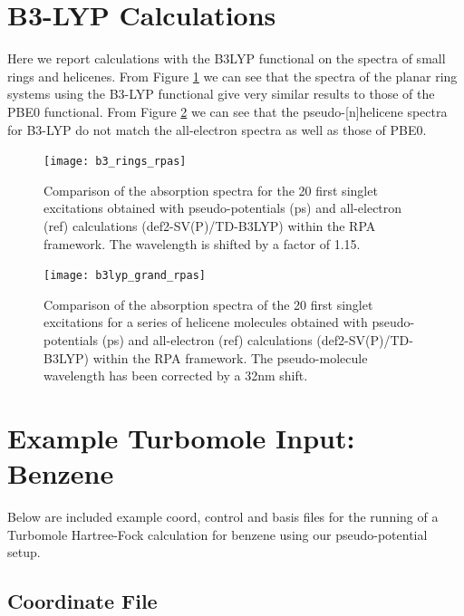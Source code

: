 \documentclass[aip]{revtex4-1}
\begin{document}
\clearpage

\section*{B3-LYP Calculations}

Here we report calculations with the B3LYP functional on the spectra of small rings and helicenes. From Figure \ref{fig:cnhn_uv_rpas_b3lyp} we can see that the spectra of the planar ring systems using the B3-LYP functional give very similar results to those of the PBE0 functional. From Figure \ref{fig:helicene_spectra_b3lyp} we can see that the pseudo-[n]helicene spectra for B3-LYP do not match the all-electron spectra as well as those of PBE0. 

\begin{figure}[b]
\begin{center}
\texttt{[image: b3\_rings\_rpas]}
\end{center}
\hspace*{3in}
\caption{Comparison of the absorption spectra for the 20 first singlet excitations obtained with
pseudo-potentials (ps) and all-electron (ref) calculations (def2-SV(P)/TD-B3LYP) within the RPA
framework. The wavelength is shifted by a factor of 1.15.}
\label{fig:cnhn_uv_rpas_b3lyp}
\end{figure}

\begin{figure}
\begin{center}
\texttt{[image: b3lyp\_grand\_rpas]}
\end{center}
\vspace{0.25in}
\hspace*{3in}
\caption{Comparison of the absorption spectra of the 20 first singlet excitations for a series of helicene molecules obtained with pseudo-potentials (ps) and all-electron (ref) calculations (def2-SV(P)/TD-B3LYP) within the RPA
framework. The pseudo-molecule wavelength has been corrected by a 32nm shift.}
\label{fig:helicene_spectra_b3lyp}
\end{figure}

\section*{Example Turbomole Input: Benzene}

Below are included example coord, control and basis files for the running of a Turbomole Hartree-Fock calculation for benzene using our pseudo-potential setup.

\subsection*{Coordinate File}
\end{document}
